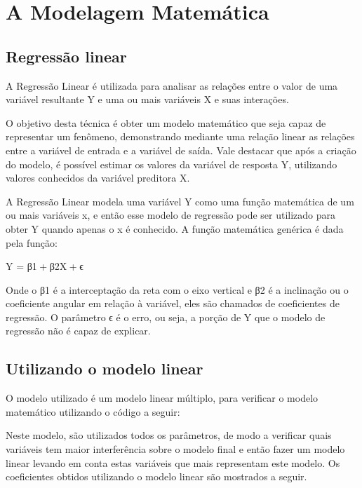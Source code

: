 \chapter{A Modelagem Matemática}
\label{chap:a_modelagem_matematica}


\section{Regressão linear}
\label{sec:a_modelagem_matematica_modelo_linear}

A Regressão Linear é utilizada para analisar as relações entre o valor de uma variável resultante Y e uma ou mais variáveis X e suas interações. 

O objetivo desta técnica é obter um modelo matemático que seja capaz de representar um fenômeno, demonstrando mediante uma relação linear as relações entre a variável de entrada e a variável de saída. Vale destacar que após a criação do modelo, é possível estimar os valores da variável de resposta Y, utilizando valores conhecidos da variável preditora X.

A Regressão Linear modela uma variável Y como uma função matemática de um ou mais variáveis x, e então esse modelo de regressão pode ser utilizado para obter Y quando apenas o x é conhecido. A função matemática genérica é dada pela função:

Y = β1 + β2X + ϵ


Onde o β1 é a interceptação da reta com o eixo vertical e β2 é a inclinação ou o coeficiente angular em relação à variável, eles são chamados de coeficientes de regressão. O parâmetro ϵ é o erro, ou seja, a porção de Y que o modelo de regressão não é capaz de explicar.

\section{Utilizando o modelo linear}
\label{sec:a_modelagem_matematica_utilizando_o_modelo_linear}

O modelo utilizado é um modelo linear múltiplo, para verificar o modelo matemático utilizando o código a seguir:


Neste modelo, são utilizados todos os parâmetros, de modo a verificar quais variáveis tem maior interferência sobre o modelo final e então fazer um modelo linear levando em conta estas variáveis que mais representam este modelo. Os coeficientes obtidos utilizando o modelo linear são mostrados a seguir.

